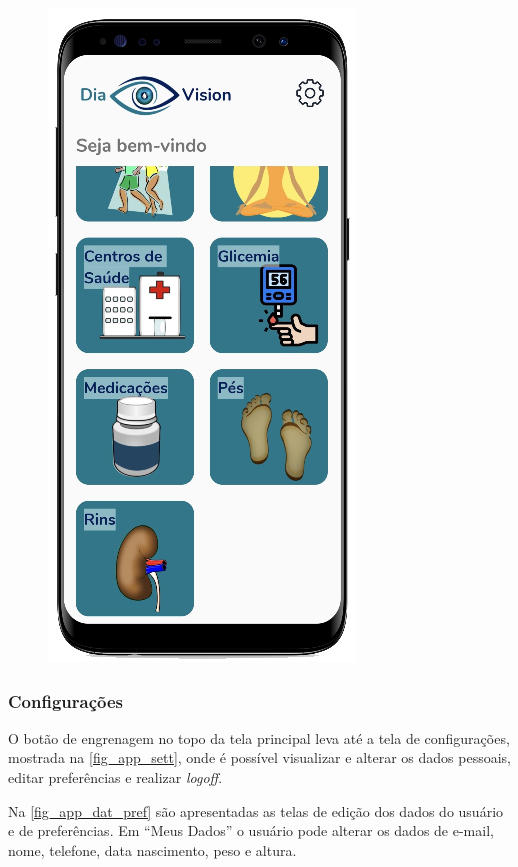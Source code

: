 \begin{figure}[htb]
\begin{minipage}{0.45\textwidth}
        \includegraphics[scale=0.66]{Imagens/desenvolvimento/app/app_inicio_2.png}
    \end{minipage}
\end{figure}

\subsubsection{Configurações}

O botão de engrenagem no topo da tela principal leva até a tela de configurações, mostrada na
\autoref{fig_app_sett}, onde é possível visualizar e alterar os dados pessoais, editar preferências
e realizar \emph{logoff}.

Na \autoref{fig_app_dat_pref} são apresentadas as telas de edição dos dados do usuário e de preferências.
Em “Meus Dados” o usuário pode alterar os dados de e-mail, nome, telefone, data nascimento, peso e altura.

